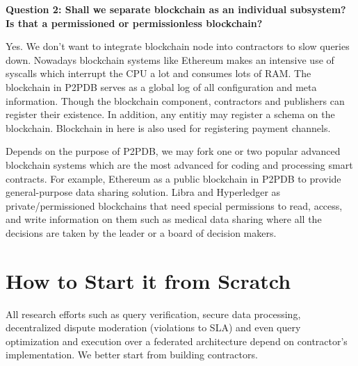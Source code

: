 \documentclass[12pt]{article}
\begin{document}
\noindent \textbf{Question 2: Shall we separate blockchain as an individual subsystem? Is that a permissioned or permissionless blockchain?}

Yes. We don't want to integrate blockchain node into contractors to slow queries down. Nowadays blockchain systems like Ethereum \cite{ethereum} makes an intensive use of syscalls which interrupt the CPU a lot \cite{analyze_eth} and consumes lots of RAM. The blockchain in P2PDB serves as a global log of all configuration and meta information. Though the blockchain component, contractors and publishers can register their existence. In addition, any entitiy may register a schema on the blockchain. Blockchain in here is also used for registering payment channels. 

Depends on the purpose of P2PDB, we may fork one or two popular advanced blockchain systems which are the most advanced for coding and processing smart contracts. For example, Ethereum as a public blockchain in P2PDB to provide general-purpose data sharing solution. Libra and Hyperledger as private/permissioned blockchains that need special permissions to read, access, and write information on them such as medical data
sharing where all the decisions are taken by the leader or a board of decision makers.


\section{How to Start it from Scratch}

All research efforts such as query verification, secure data processing, decentralized dispute moderation (violations to SLA) and even query optimization and execution over a federated architecture depend on contractor's implementation. We better start from building contractors.
\end{document}
